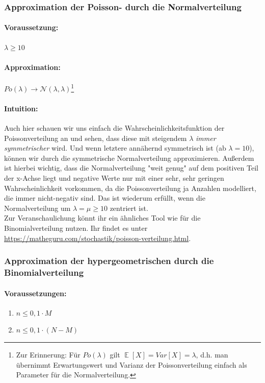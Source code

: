 \documentclass[a4paper]{article}
\DeclareMathOperator*{\E}{\mathbb{E}}
\begin{document}
\subsubsection{Approximation der Poisson- durch die Normalverteilung}\label{sec:PoN}
\paragraph{Voraussetzung:} $\lambda \geq 10$
\paragraph{Approximation:} $Po(\lambda) \rightarrow \mathcal{N}(\lambda,\lambda)$\footnote{Zur Erinnerung: Für $Po(\lambda)$ gilt $\E[X]=Var[X]=\lambda$, d.h. man übernimmt Erwartungswert und Varianz der Poissonverteilung einfach als Parameter für die Normalverteilung.}
\paragraph{Intuition:} Auch hier schauen wir uns einfach die Wahrscheinlichkeitsfunktion der Poissonverteilung an und sehen, dass diese mit steigendem $\lambda$ \textit{immer symmetrischer} wird. Und wenn letztere annähernd symmetrisch ist (ab $\lambda = 10$), können wir durch die symmetrische Normalverteilung approximieren. Außerdem ist hierbei wichtig, dass die Normalverteilung "weit genug" auf dem positiven Teil der x-Achse liegt und negative Werte nur mit einer sehr, sehr geringen Wahrscheinlichkeit vorkommen, da die Poissonverteilung ja Anzahlen modelliert, die immer nicht-negativ sind. Das ist wiederum erfüllt, wenn die Normalverteilung um $\lambda=\mu \geq 10$ zentriert ist.\\

\noindent Zur Veranschaulichung könnt ihr ein ähnliches Tool wie für die Binomialverteilung nutzen. Ihr findet es unter \url{https://matheguru.com/stochastik/poisson-verteilung.html}.

\subsubsection{Approximation der hypergeometrischen durch die Binomialverteilung}\label{sec:HypBin}

\paragraph{Voraussetzungen:} \begin{enumerate}
\item $n \leq 0,1\cdot M$
\item $n \leq 0,1\cdot (N-M)$
\end{enumerate}
\end{document}
